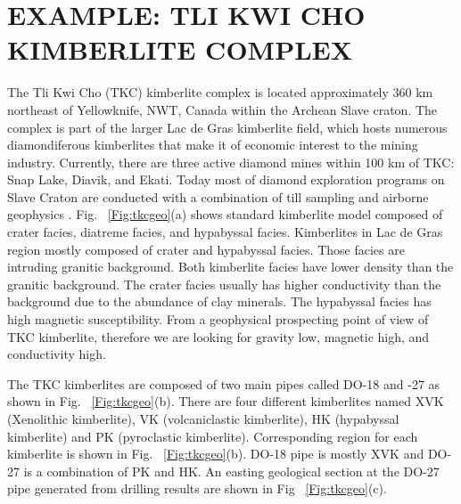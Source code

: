 \documentclass[letterpaper,11pt]{article}
\begin{document}
\section{EXAMPLE: TLI KWI CHO KIMBERLITE COMPLEX}
The Tli Kwi Cho (TKC) kimberlite complex is located approximately 360 km northeast of Yellowknife, NWT, Canada within the Archean Slave craton. The complex is part of the larger Lac de Gras kimberlite field, which hosts numerous diamondiferous kimberlites that make it of economic interest to the mining industry. Currently, there are three active diamond mines within 100 km of TKC: Snap Lake, Diavik, and Ekati. Today most of diamond exploration programs on Slave Craton are conducted with a combination of till sampling and airborne geophysics \cite[]{Pell1997}. Fig. ~\ref{Fig:tkcgeo}(a) shows standard kimberlite model composed of crater facies, diatreme facies, and hypabyssal facies. Kimberlites in Lac de Gras region mostly composed of crater and hypabyssal facies. Those facies are intruding granitic background. Both kimberlite facies have lower density than the granitic background. The crater facies usually has higher conductivity than the background due to the abundance of clay minerals. The hypabyssal facies has high magnetic susceptibility. From a geophysical prospecting point of view of TKC kimberlite, therefore we are looking for gravity low, magnetic high, and conductivity high. 

The TKC kimberlites are composed of two main pipes called DO-18 and -27 as shown in  Fig. ~\ref{Fig:tkcgeo}(b). There are four different kimberlites named XVK (Xenolithic kimberlite), VK (volcaniclastic kimberlite), HK (hypabyssal kimberlite) and PK (pyroclastic kimberlite). Corresponding region for each kimberlite is shown in Fig. ~\ref{Fig:tkcgeo}(b). DO-18 pipe is mostly XVK and DO-27 is a combination of PK and HK. An easting geological section at the DO-27 pipe generated from drilling results \cite[]{HarderEtAl2006} are shown in Fig ~\ref{Fig:tkcgeo}(c). 
\end{document}
